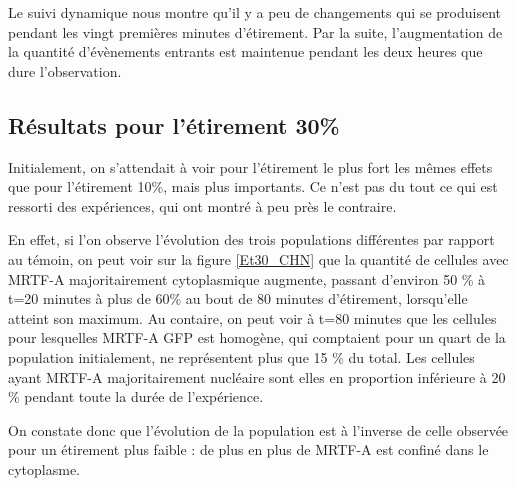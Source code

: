 Le suivi dynamique nous montre qu'il y a peu de changements qui se produisent pendant les vingt premières minutes d'étirement. Par la suite, l'augmentation de la quantité d'évènements entrants est maintenue pendant les deux heures que dure l'observation. 


\subsection{Résultats pour l'étirement 30\%}

Initialement, on s'attendait à voir pour l'étirement le plus fort les mêmes effets que pour l'étirement 10\%, mais plus importants. 
Ce n'est pas du tout ce qui est ressorti des expériences, qui ont montré à peu près le contraire. 

En effet, si l'on observe l'évolution des trois populations différentes par rapport au témoin, on peut voir sur la figure \ref{Et30_CHN} que la quantité de cellules avec MRTF-A majoritairement cytoplasmique augmente, passant d'environ 50 \% à t=20 minutes à plus de 60\% au bout de 80 minutes d'étirement, lorsqu'elle atteint son maximum. 
Au contaire, on peut voir à t=80 minutes que les cellules pour lesquelles MRTF-A GFP est homogène, qui comptaient pour un quart de la population initialement, ne représentent plus que 15 \% du total. 
Les cellules ayant MRTF-A majoritairement nucléaire sont elles en proportion inférieure à 20 \% pendant toute la durée de l'expérience. 

On constate donc que l'évolution de la population est à l'inverse de celle observée pour un étirement plus faible : de plus en plus de MRTF-A est confiné dans le cytoplasme. 

